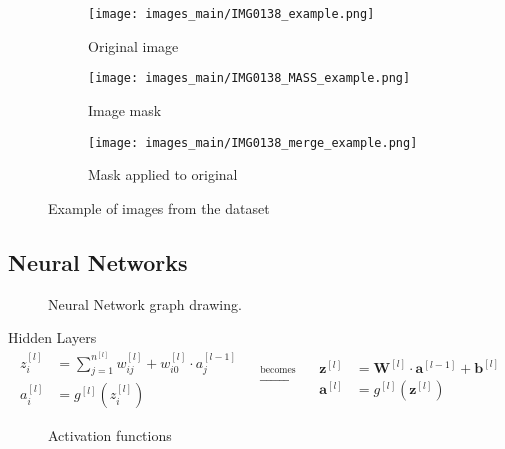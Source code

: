 \begin{frame}
  \begin{figure}
    \centering
    \begin{subfigure}[t]{.32\textwidth}
      \centering
      \texttt{[image: images\_main/IMG0138\_example.png]}
      \caption{Original image}
    \end{subfigure}
    \hfill
    \begin{subfigure}[t]{.32\textwidth}
      \centering
      \texttt{[image: images\_main/IMG0138\_MASS\_example.png]}
      \caption{Image mask}
    \end{subfigure}
    \hfill
    \begin{subfigure}[t]{.32\textwidth}
      \centering
      \texttt{[image: images\_main/IMG0138\_merge\_example.png]}
      \caption{Mask applied to original}
    \end{subfigure}
  
    \caption[Images from the dataset]{
      Example of images from the dataset
    }
  \end{figure}
\end{frame}

\subsection{Neural Networks}
\begin{frame}{\insertsubsec}
  \begin{figure}
    \centering
    
    \caption[Neural network graph]{
      Neural Network graph drawing. 
    }
  \end{figure}
\end{frame}

\begin{frame}
  \begin{block}{Hidden Layers}
    \begin{equation*}
      \begin{aligned}
        z_i^{[l]} &= \sum_{j = 1}^{n^{[l]}} w_{ij}^{[l]} + w_{i0}^{[l]} \cdot a_j^{[l - 1]} \\
        a_i^{[l]} &= g^{[l]}(z_i^{[l]})
      \end{aligned}
      \quad
      \xrightarrow{\text{becomes}}
      \quad
      \begin{aligned}
        \bm{z}^{[l]} &= \bm{W}^{[l]} \cdot \bm{a}^{[l - 1]} + \bm{b}^{[l]} \\
        \bm{a}^{[l]} &= g^{[l]}(\bm{z}^{[l]})
      \end{aligned}
    \end{equation*}
  
  \end{block}
  \begin{figure}
    \centering
    
  
    \caption[Activation functions]{
      Activation functions
    }
  \end{figure}
\end{frame}

